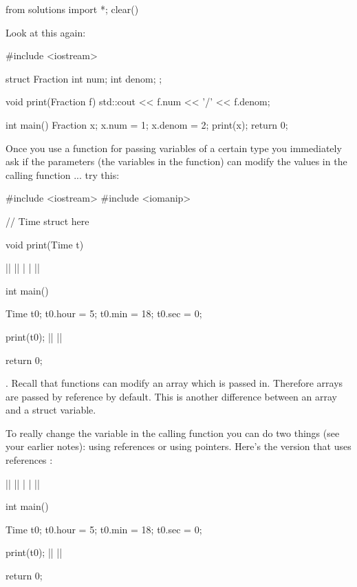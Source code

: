 \begin{python0}
from solutions import *; clear()
\end{python0}

Look at this again:

\begin{consolethree}[escapeinside=||]
#include <iostream>

struct Fraction
{
    int num;
    int denom;
};

void print(Fraction f)
{
    std::cout << f.num << '/' << f.denom;
}

int main()
{
    Fraction x;
    x.num = 1;
    x.denom = 2;
    print(x);
    return 0;
}
\end{consolethree}


Once you use a function for passing variables of a certain type you
immediately ask if the parameters (the variables in the function) can
modify the values in the calling function ... try this:

\begin{consolethree}[escapeinside=||]
#include <iostream>
#include <iomanip>

// Time struct here

void print(Time t)
{
}

||
|\EMPHASIZE{\{}|
|  |
|\EMPHASIZE{\}}|

int main()
{

  Time t0;
  t0.hour = 5;
  t0.min = 18;
  t0.sec = 0;

  print(t0);
  ||
  ||

  return 0;
}
\end{consolethree}

. Recall that functions can modify an array which is
passed in. Therefore arrays are passed by reference by default. This is
another difference between an array and a struct variable.

To really change the variable in the calling function you can do two things
(see your earlier notes): using references or using pointers. Here's the
version that uses references
:

\begin{consolethree}[escapeinside=||]
||
|\EMPHASIZE{\{}|
|  |
|\EMPHASIZE{\}}|

int main()
{
  Time t0;
  t0.hour = 5;
  t0.min = 18;
  t0.sec = 0;

  print(t0);
  ||
  ||

  return 0;
}
\end{consolethree}

